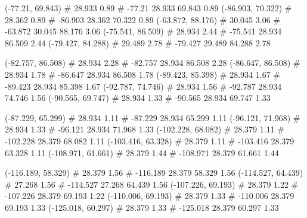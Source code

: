 \documentclass[a4paper,openbib,10pt]{article}
\newenvironment{treegraph}{\begin{graph}}{\end{graph}}
\begin{document}
\begin{treegraph}
  (-77.21, 69.843) #     28.933    0.89
   #    -77.21    28.933    69.843    0.89
  (-86.903, 70.322) #     28.362    0.89
   #    -86.903    28.362    70.322    0.89
  (-63.872, 88.176) #     30.045    3.06
   #    -63.872    30.045    88.176    3.06
  (-75.541, 86.509) #     28.934    2.44
   #    -75.541    28.934    86.509    2.44
  (-79.427, 84.288) #     29.489    2.78
   #    -79.427    29.489    84.288    2.78

  (-82.757, 86.508) #     28.934    2.28
   #    -82.757    28.934    86.508    2.28
  (-86.647, 86.508) #     28.934    1.78
   #    -86.647    28.934    86.508    1.78
  (-89.423, 85.398) #     28.934    1.67
   #    -89.423    28.934    85.398    1.67
  (-92.787, 74.746) #     28.934    1.56
   #    -92.787    28.934    74.746    1.56
  (-90.565, 69.747) #     28.934    1.33
   #    -90.565    28.934    69.747    1.33

  (-87.229, 65.299) #     28.934    1.11
   #    -87.229    28.934    65.299    1.11
  (-96.121, 71.968) #     28.934    1.33
   #    -96.121    28.934    71.968    1.33
  (-102.228, 68.082) #     28.379    1.11
   #    -102.228    28.379    68.082    1.11
  (-103.416, 63.328) #     28.379    1.11
   #    -103.416    28.379    63.328    1.11
  (-108.971, 61.661) #     28.379    1.44
   #    -108.971    28.379    61.661    1.44

  (-116.189, 58.329) #     28.379    1.56
   #    -116.189    28.379    58.329    1.56
  (-114.527, 64.439) #     27.268    1.56
   #    -114.527    27.268    64.439    1.56
  (-107.226, 69.193) #     28.379    1.22
   #    -107.226    28.379    69.193    1.22
  (-110.006, 69.193) #     28.379    1.33
   #    -110.006    28.379    69.193    1.33
  (-125.018, 60.297) #     28.379    1.33
   #    -125.018    28.379    60.297    1.33


\end{treegraph}
\end{document}
